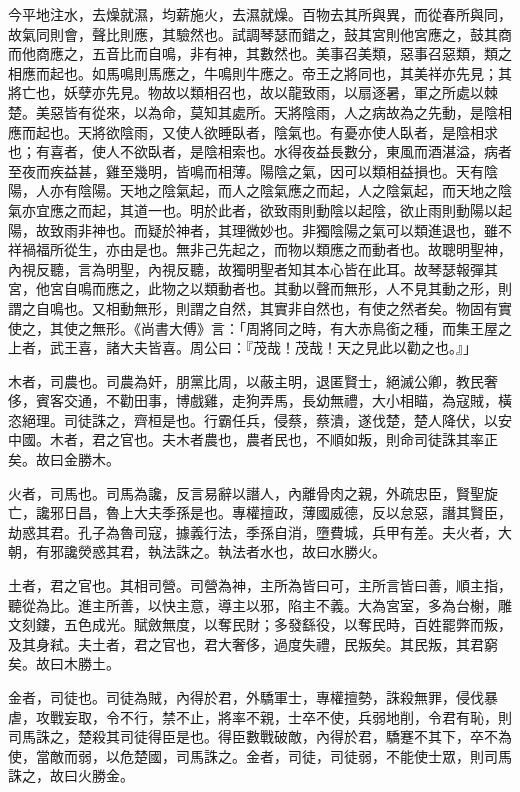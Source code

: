 今平地注水，去燥就濕，均薪施火，去濕就燥。百物去其所與異，而從春所與同，故氣同則會，聲比則應，其驗然也。試調琴瑟而錯之，鼓其宮則他宮應之，鼓其商而他商應之，五音比而自鳴，非有神，其數然也。美事召美類，惡事召惡類，類之相應而起也。如馬鳴則馬應之，牛鳴則牛應之。帝王之將同也，其美祥亦先見；其將亡也，妖孽亦先見。物故以類相召也，故以龍致雨，以扇逐暑，軍之所處以棘楚。美惡皆有從來，以為命，莫知其處所。天將陰雨，人之病故為之先動，是陰相應而起也。天將欲陰雨，又使人欲睡臥者，陰氣也。有憂亦使人臥者，是陰相求也；有喜者，使人不欲臥者，是陰相索也。水得夜益長數分，東風而酒湛溢，病者至夜而疾益甚，雞至幾明，皆鳴而相薄。陽陰之氣，因可以類相益損也。天有陰陽，人亦有陰陽。天地之陰氣起，而人之陰氣應之而起，人之陰氣起，而天地之陰氣亦宜應之而起，其道一也。明於此者，欲致雨則動陰以起陰，欲止雨則動陽以起陽，故致雨非神也。而疑於神者，其理微妙也。非獨陰陽之氣可以類進退也，雖不祥禍福所從生，亦由是也。無非己先起之，而物以類應之而動者也。故聰明聖神，內視反聽，言為明聖，內視反聽，故獨明聖者知其本心皆在此耳。故琴瑟報彈其宮，他宮自鳴而應之，此物之以類動者也。其動以聲而無形，人不見其動之形，則謂之自鳴也。又相動無形，則謂之自然，其實非自然也，有使之然者矣。物固有實使之，其使之無形。《尚書大傅》言：「周將同之時，有大赤鳥銜之種，而集王屋之上者，武王喜，諸大夫皆喜。周公曰：『茂哉！茂哉！天之見此以勸之也。』」


木者，司農也。司農為奸，朋黨比周，以蔽主明，退匿賢士，絕滅公卿，教民奢侈，賓客交通，不勸田事，博戲雞，走狗弄馬，長幼無禮，大小相瞄，為寇賊，橫恣絕理。司徒誅之，齊桓是也。行霸任兵，侵蔡，蔡潰，遂伐楚，楚人降伏，以安中國。木者，君之官也。夫木者農也，農者民也，不順如叛，則命司徒誅其率正矣。故曰金勝木。


火者，司馬也。司馬為讒，反言易辭以譖人，內離骨肉之親，外疏忠臣，賢聖旋亡，讒邪日昌，魯上大夫季孫是也。專權擅政，薄國威德，反以怠惡，譖其賢臣，劫惑其君。孔子為魯司寇，據義行法，季孫自消，墮費城，兵甲有差。夫火者，大朝，有邪讒熒惑其君，執法誅之。執法者水也，故曰水勝火。


土者，君之官也。其相司營。司營為神，主所為皆曰可，主所言皆曰善，順主指，聽從為比。進主所善，以快主意，導主以邪，陷主不義。大為宮室，多為台榭，雕文刻鏤，五色成光。賦斂無度，以奪民財；多發繇役，以奪民時，百姓罷弊而叛，及其身弒。夫土者，君之官也，君大奢侈，過度失禮，民叛矣。其民叛，其君窮矣。故曰木勝土。


金者，司徒也。司徒為賊，內得於君，外驕軍士，專權擅勢，誅殺無罪，侵伐暴虐，攻戰妄取，令不行，禁不止，將率不親，士卒不使，兵弱地削，令君有恥，則司馬誅之，楚殺其司徒得臣是也。得臣數戰破敵，內得於君，驕蹇不其下，卒不為使，當敵而弱，以危楚國，司馬誅之。金者，司徒，司徒弱，不能使士眾，則司馬誅之，故曰火勝金。


